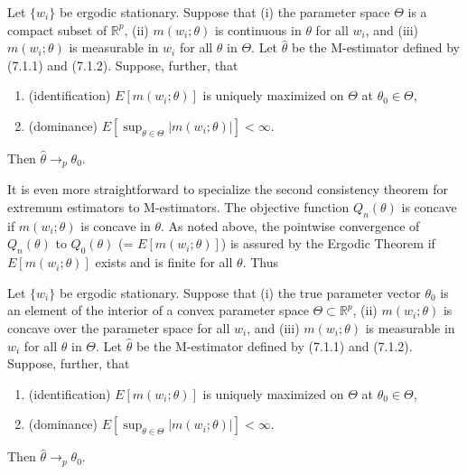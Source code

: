 \begin{proposition}
\begin{proposition}
Let $\{w_i\}$ be ergodic stationary. Suppose that (i) the parameter space $\Theta$ is a compact subset of $\mathbb{R}^p$, (ii) $m(w_i; \theta)$ is continuous in $\theta$ for all $w_i$, and (iii) $m(w_i; \theta)$ is measurable in $w_i$ for all $\theta$ in $\Theta$. Let $\hat{\theta}$ be the M-estimator defined by (7.1.1) and (7.1.2). Suppose, further, that
\begin{enumerate}
    \item (identification) $E[m(w_i; \theta)]$ is uniquely maximized on $\Theta$ at $\theta_0 \in \Theta$,
    \item (dominance) $E[\sup_{\theta \in \Theta} |m(w_i; \theta)|] < \infty$.
\end{enumerate}
Then $\hat{\theta} \to_p \theta_0$.

It is even more straightforward to specialize the second consistency theorem for extremum estimators to M-estimators. The objective function $Q_n(\theta)$ is concave if $m(w_i; \theta)$ is concave in $\theta$. As noted above, the pointwise convergence of $Q_n(\theta)$ to $Q_0(\theta)$ (= $E[m(w_i; \theta)]$) is assured by the Ergodic Theorem if $E[m(w_i; \theta)]$ exists and is finite for all $\theta$. Thus

\begin{proposition}
Let $\{w_i\}$ be ergodic stationary. Suppose that (i) the true parameter vector $\theta_0$ is an element of the interior of a convex parameter space $\Theta \subset \mathbb{R}^p$, (ii) $m(w_i; \theta)$ is concave over the parameter space for all $w_i$, and (iii) $m(w_i; \theta)$ is measurable in $w_i$ for all $\theta$ in $\Theta$. Let $\hat{\theta}$ be the M-estimator defined by (7.1.1) and (7.1.2). Suppose, further, that
\begin{enumerate}
    \item (identification) $E[m(w_i; \theta)]$ is uniquely maximized on $\Theta$ at $\theta_0 \in \Theta$,
    \item (dominance) $E[\sup_{\theta \in \Theta} |m(w_i; \theta)|] < \infty$.
\end{enumerate}
Then $\hat{\theta} \to_p \theta_0$.


\end{proposition}
\end{proposition}
\end{proposition}
